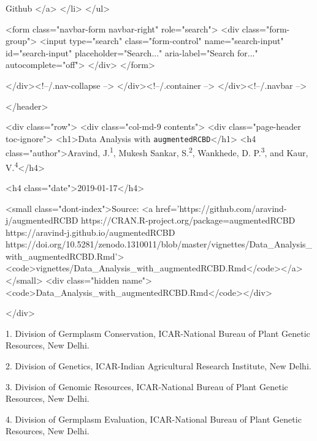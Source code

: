     Github
  </a>
</li>
      </ul>
      
      <form class="navbar-form navbar-right" role="search">
        <div class="form-group">
          <input type="search" class="form-control" name="search-input" id="search-input" placeholder="Search..." aria-label="Search for..." autocomplete="off">
        </div>
      </form>
      
    </div><!--/.nav-collapse -->
  </div><!--/.container -->
</div><!--/.navbar -->

      
      </header>

\usepackage{fancyhdr}
\usepackage{wrapfig}
\usepackage{float}
\pagestyle{fancy}
\fancyhead[LE,RO]{\slshape \rightmark}
\fancyfoot[C]{\thepage}
\usepackage{hyperref}
\hypersetup{colorlinks=true}
\hypersetup{linktoc=all}
\hypersetup{linkcolor=blue}
\usepackage{pdflscape}
\usepackage{booktabs}
\newcommand{\blandscape}{\begin{landscape}}
\newcommand{\elandscape}{\end{landscape}}
\renewcommand\thesection{\arabic{section}}

<div class="row">
  <div class="col-md-9 contents">
    <div class="page-header toc-ignore">
      <h1>Data Analysis with \texttt{augmentedRCBD}</h1>
                        <h4 class="author">Aravind, J.\textsuperscript{1}, Mukesh Sankar, S.\textsuperscript{2},
Wankhede, D. P.\textsuperscript{3}, and Kaur, V.\textsuperscript{4}</h4>
            
            <h4 class="date">2019-01-17</h4>
      
      <small class="dont-index">Source: <a href='https://github.com/aravind-j/augmentedRCBD
    https://CRAN.R-project.org/package=augmentedRCBD
    https://aravind-j.github.io/augmentedRCBD
    https://doi.org/10.5281/zenodo.1310011/blob/master/vignettes/Data_Analysis_with_augmentedRCBD.Rmd'><code>vignettes/Data_Analysis_with_augmentedRCBD.Rmd</code></a></small>
      <div class="hidden name"><code>Data_Analysis_with_augmentedRCBD.Rmd</code></div>

    </div>

    
    
\begin{center}
1. Division of Germplasm Conservation, ICAR-National Bureau of Plant Genetic Resources, New Delhi.

2. Division of Genetics, ICAR-Indian Agricultural Research Institute, New Delhi.

3. Division of Genomic Resources, ICAR-National Bureau of Plant Genetic Resources, New Delhi.

4. Division of Germplasm Evaluation, ICAR-National Bureau of Plant Genetic Resources, New Delhi.

\end{center}

